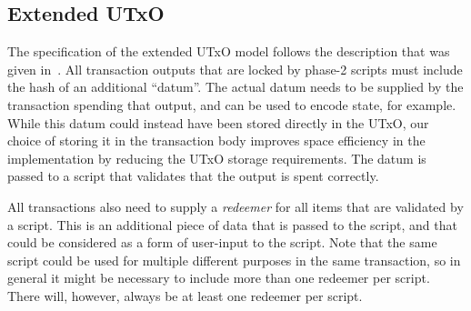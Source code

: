 \subsection{Extended UTxO}

The specification of the extended UTxO model follows the description that was given in~\cite{chakravarty2020extended}.
All transaction outputs that are locked by phase-2 scripts must include the hash of an additional ``datum''. The actual datum needs to be supplied by the transaction spending that output, and can be used to encode state, for example.
While this datum could instead have been stored directly in the UTxO, our choice of storing it in the transaction body improves space efficiency in the implementation by reducing the UTxO storage requirements. The datum is passed to a script that validates that the output is spent correctly.

All transactions also need to supply a \emph{redeemer} for all items that are validated by a script. This is an additional piece of data that is passed to the script, and that could be considered as a form of user-input to the script. Note that the same script could be used for multiple different purposes in the same transaction, so in general it might be necessary to include more than one redeemer per script.
There will, however, always be at least one redeemer per script.
